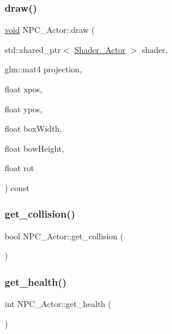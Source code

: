 \mbox{\label{classNPC__Actor_af33500f1aeb5c8e845fdaf386d736050}} 
\subsubsection{\texorpdfstring{draw()}{draw()}}
{\footnotesize\ttfamily \hyperlink{imgui__impl__opengl3__loader_8h_ac668e7cffd9e2e9cfee428b9b2f34fa7}{void} N\+P\+C\+\_\+\+Actor\+::draw (\begin{DoxyParamCaption}\item[{std\+::shared\+\_\+ptr$<$ \hyperlink{classShader__Actor}{Shader\+\_\+\+Actor} $>$}]{shader,  }\item[{glm\+::mat4}]{projection,  }\item[{float}]{xpos,  }\item[{float}]{ypos,  }\item[{float}]{box\+Width,  }\item[{float}]{bow\+Height,  }\item[{float}]{rot }\end{DoxyParamCaption}) const}

\mbox{\label{classNPC__Actor_a0957033379358fcfb66b07307f25c32e}} 
\subsubsection{\texorpdfstring{get\+\_\+collision()}{get\_collision()}}
{\footnotesize\ttfamily bool N\+P\+C\+\_\+\+Actor\+::get\+\_\+collision (\begin{DoxyParamCaption}{ }\end{DoxyParamCaption})\hspace{0.3cm}{\ttfamily [inline]}}

\mbox{\label{classNPC__Actor_aefa30370f75f0af9c12eb3ea67fb3722}} 
\subsubsection{\texorpdfstring{get\+\_\+health()}{get\_health()}}
{\footnotesize\ttfamily int N\+P\+C\+\_\+\+Actor\+::get\+\_\+health (\begin{DoxyParamCaption}{ }\end{DoxyParamCaption})\hspace{0.3cm}{\ttfamily [inline]}}

